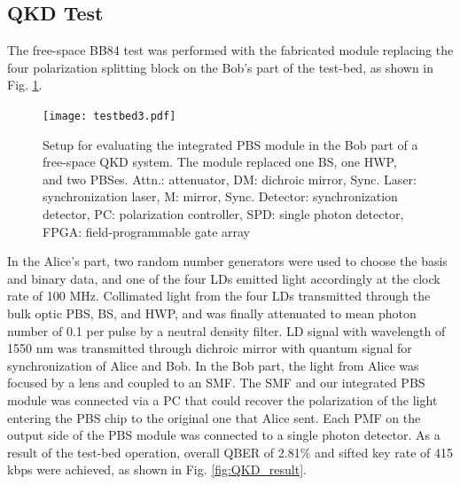\documentclass[letterpaper, 10pt]{article}
\begin{document}
\subsection{QKD Test}
The free-space BB84 test was performed with the fabricated module replacing the four polarization splitting block on the Bob's part of the test-bed, as shown in Fig. \ref{fig:testbed}.
\begin{figure}
  \centering
  \texttt{[image: testbed3.pdf]}
  \caption{Setup for evaluating the integrated PBS module in the Bob part of a free-space QKD system. The module replaced one BS, one HWP, and two PBSes. Attn.: attenuator, DM: dichroic mirror, Sync. Laser: synchronization laser, M: mirror, Sync. Detector: synchronization detector, PC: polarization controller, SPD: single photon detector, FPGA: field-programmable gate array}
  \label{fig:testbed}
\end{figure}
In the Alice's part, two random number generators were used to choose the basis and binary data, and one of the four LDs emitted light accordingly at the clock rate of 100 MHz.
Collimated light from the four LDs transmitted  through the bulk optic PBS, BS, and HWP, and was finally attenuated to mean photon number of 0.1 per pulse by a neutral density filter.
LD signal with wavelength of 1550 nm was transmitted through dichroic mirror with quantum signal for synchronization of Alice and Bob.
In the Bob part, the light from Alice was  focused by a lens and coupled to an SMF.
The SMF and our integrated PBS module was connected via a PC that could recover the polarization of the light entering the PBS chip to the original one that Alice sent.
Each PMF on the output side of the PBS module was connected to a single photon detector.
As a result of the test-bed operation, overall QBER of 2.81\% and sifted key rate of 415 kbps were achieved, as shown in Fig. \ref{fig:QKD_result}.
\end{document}
